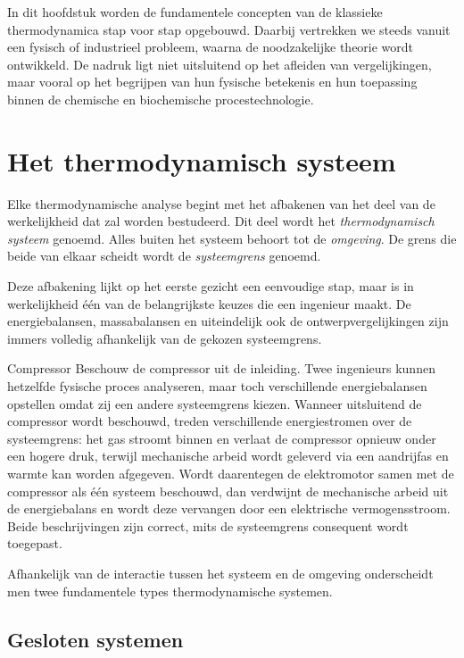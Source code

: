 In dit hoofdstuk worden de fundamentele concepten van de klassieke thermodynamica stap voor stap opgebouwd. Daarbij vertrekken we steeds vanuit een fysisch of industrieel probleem, waarna de noodzakelijke theorie wordt ontwikkeld. De nadruk ligt niet uitsluitend op het afleiden van vergelijkingen, maar vooral op het begrijpen van hun fysische betekenis en hun toepassing binnen de chemische en biochemische procestechnologie.

\section{Het thermodynamisch systeem}

Elke thermodynamische analyse begint met het afbakenen van het deel van de werkelijkheid dat zal worden bestudeerd. Dit deel wordt het \emph{thermodynamisch systeem} genoemd. Alles buiten het systeem behoort tot de \emph{omgeving}. De grens die beide van elkaar scheidt wordt de \emph{systeemgrens} genoemd.

Deze afbakening lijkt op het eerste gezicht een eenvoudige stap, maar is in werkelijkheid \'e\'en van de belangrijkste keuzes die een ingenieur maakt. De energiebalansen, massabalansen en uiteindelijk ook de ontwerpvergelijkingen zijn immers volledig afhankelijk van de gekozen systeemgrens.

\begin{toepassing}{Compressor}
Beschouw de compressor uit de inleiding. Twee ingenieurs kunnen hetzelfde fysische proces analyseren, maar toch verschillende energiebalansen opstellen omdat zij een andere systeemgrens kiezen. Wanneer uitsluitend de compressor wordt beschouwd, treden verschillende energiestromen over de systeemgrens: het gas stroomt binnen en verlaat de compressor opnieuw onder een hogere druk, terwijl mechanische arbeid wordt geleverd via een aandrijfas en warmte kan worden afgegeven. Wordt daarentegen de elektromotor samen met de compressor als \'e\'en systeem beschouwd, dan verdwijnt de mechanische arbeid uit de energiebalans en wordt deze vervangen door een elektrische vermogensstroom. Beide beschrijvingen zijn correct, mits de systeemgrens consequent wordt toegepast.
\end{toepassing}

Afhankelijk van de interactie tussen het systeem en de omgeving onderscheidt men twee fundamentele types thermodynamische systemen.

\subsection{Gesloten systemen}

